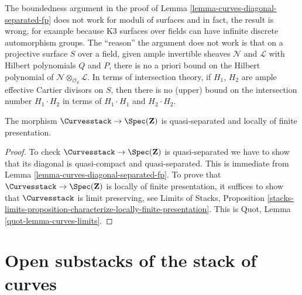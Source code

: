 \begin{remark}
\label{remark-boundedness-aut-does-not-work-surfaces}
The boundedness argument in the proof of
Lemma \ref{lemma-curves-diagonal-separated-fp}
does not work for moduli of surfaces and in fact,
the result is wrong, for example because K3 surfaces
over fields can have infinite discrete automorphism groups.
The ``reason'' the argument does not work is that on a
projective surface $S$ over a field,
given ample invertible sheaves $\mathcal{N}$
and $\mathcal{L}$ with Hilbert polynomials $Q$ and $P$,
there is no a priori bound on the Hilbert polynomial
of $\mathcal{N} \otimes_{\mathcal{O}_S} \mathcal{L}$.
In terms of intersection theory, if $H_1$, $H_2$ are ample effective
Cartier divisors on $S$,
then there is no (upper) bound on the intersection number $H_1 \cdot H_2$
in terms of $H_1 \cdot H_1$ and $H_2 \cdot H_2$.
\end{remark}

\begin{lemma}
\label{lemma-curves-qs-lfp}
The morphism $\Curvesstack \to \Spec(\mathbf{Z})$ is quasi-separated and
locally of finite presentation.
\end{lemma}

\begin{proof}
To check $\Curvesstack \to \Spec(\mathbf{Z})$ is quasi-separated we have to
show that its diagonal is quasi-compact and quasi-separated.
This is immediate from Lemma \ref{lemma-curves-diagonal-separated-fp}.
To prove that $\Curvesstack \to \Spec(\mathbf{Z})$ is locally of finite
presentation, it suffices to show that $\Curvesstack$
is limit preserving, see Limits of Stacks, Proposition
\ref{stacks-limits-proposition-characterize-locally-finite-presentation}.
This is Quot, Lemma \ref{quot-lemma-curves-limits}.
\end{proof}






\section{Open substacks of the stack of curves}
\label{section-open}


